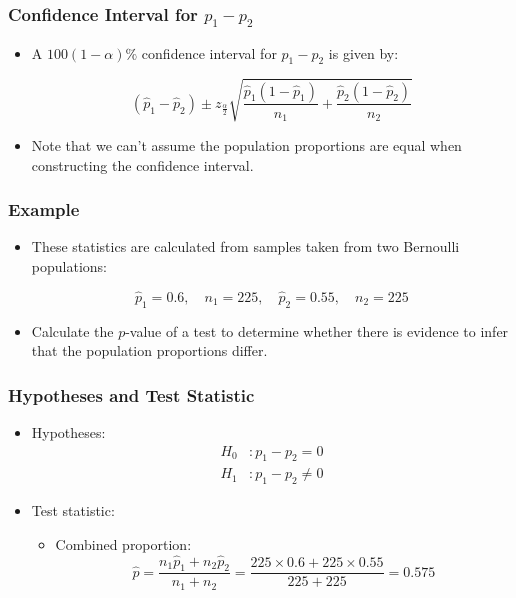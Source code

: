 \documentclass[12pt]{beamer}
\begin{document}
	\begin{frame}
		\frametitle{Confidence Interval for $p_1 - p_2$}
		
		\begin{itemize}[label={\color{blue}$\blacktriangleright$}]
			\item A $100(1 - \alpha)\%$ confidence interval for $p_1 - p_2$ is given by:
			
			\vspace{0.5cm}
			
			\[
			(\hat{p}_1 - \hat{p}_2) \pm z_{\frac{\alpha}{2}} \sqrt{\frac{\hat{p}_1(1 - \hat{p}_1)}{n_1} + \frac{\hat{p}_2(1 - \hat{p}_2)}{n_2}}
			\]
			
			\vspace{0.5cm}
			
			\item Note that we can't assume the population proportions are equal when constructing the confidence interval.
		\end{itemize}
		
	\end{frame}
	\begin{frame}
		\frametitle{Example}
		
		\begin{itemize}[label={\color{blue}$\blacktriangleright$}]
			\item These statistics are calculated from samples taken from two Bernoulli populations:
			
			\vspace{0.5cm}
			
			\[
			\hat{p}_1 = 0.6, \quad n_1 = 225, \quad \hat{p}_2 = 0.55, \quad n_2 = 225
			\]
			
			\vspace{0.5cm}
			
			\item Calculate the $p$-value of a test to determine whether there is evidence to infer that the population proportions differ.
		\end{itemize}
		
	\end{frame}
	\begin{frame}
		\frametitle{Hypotheses and Test Statistic}
		
		\begin{itemize}[label={\color{blue}$\blacktriangleright$}]
			\item Hypotheses:
			\[
			\begin{aligned}
				H_0 &: p_1 - p_2 = 0 \\
				H_1 &: p_1 - p_2 \neq 0
			\end{aligned}
			\]
			
			\item Test statistic:
			\begin{itemize}[label={\color{blue}$\blacktriangleright$}]
				\item Combined proportion:
				\[
				\hat{p} = \frac{n_1\hat{p}_1 + n_2\hat{p}_2}{n_1 + n_2} = \frac{225 \times 0.6 + 225 \times 0.55}{225 + 225} = 0.575
				\]
			\end{itemize}
		\end{itemize}
		
	\end{frame}
\end{document}
